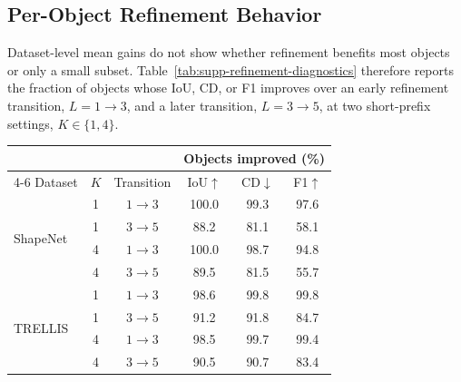 \begin{figure}[!t]
    \label{fig:supp-heatmaps}
\end{figure}

\subsection{Per-Object Refinement Behavior}

Dataset-level mean gains do not show whether refinement benefits most objects
or only a small subset. Table~\ref{tab:supp-refinement-diagnostics} therefore
reports the fraction of objects whose IoU, CD, or F1 improves over an early
refinement transition, $L=1\!\rightarrow\!3$, and a later transition,
$L=3\!\rightarrow\!5$, at two short-prefix settings,
$K\in\{1,4\}$.

\par\medskip
\noindent\begin{minipage}{\columnwidth}
\centering
\small
\setlength{\tabcolsep}{5pt}
\begin{tabular}{lccccc}
\toprule
& & & \multicolumn{3}{c}{Objects improved (\%)} \\
\cmidrule(lr){4-6}
Dataset & $K$ & Transition & IoU$\uparrow$ & CD$\downarrow$ & F1$\uparrow$ \\
\midrule
\multirow{4}{*}{ShapeNet}
 & 1 & $1\!\rightarrow\!3$ & 100.0 & 99.3 & 97.6 \\
 & 1 & $3\!\rightarrow\!5$ & 88.2 & 81.1 & 58.1 \\
 & 4 & $1\!\rightarrow\!3$ & 100.0 & 98.7 & 94.8 \\
 & 4 & $3\!\rightarrow\!5$ & 89.5 & 81.5 & 55.7 \\
\midrule
\multirow{4}{*}{TRELLIS}
 & 1 & $1\!\rightarrow\!3$ & 98.6 & 99.8 & 99.8 \\
 & 1 & $3\!\rightarrow\!5$ & 91.2 & 91.8 & 84.7 \\
 & 4 & $1\!\rightarrow\!3$ & 98.5 & 99.7 & 99.4 \\
 & 4 & $3\!\rightarrow\!5$ & 90.5 & 90.7 & 83.4 \\
\bottomrule
\end{tabular}
\label{tab:supp-refinement-diagnostics}
\end{minipage}
\par\medskip

